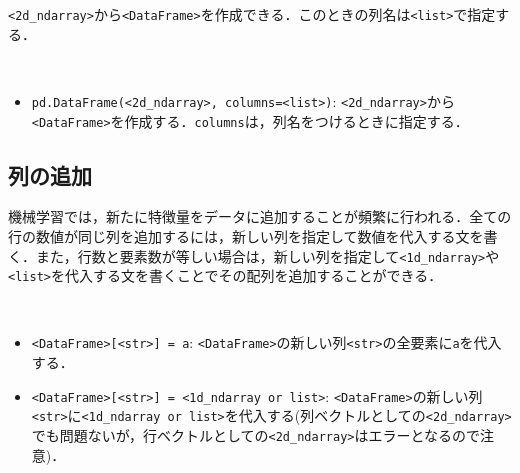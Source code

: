 \texttt{<2d\_ndarray>}から\texttt{<DataFrame>}を作成できる．このときの列名は\texttt{<list>}で指定する．

\begin{gram}　
\begin{itemize}
\item \texttt{pd.DataFrame(<2d\_ndarray>, columns=<list>)}: \texttt{<2d\_ndarray>}から\texttt{<DataFrame>}を作成する．\texttt{columns}は，列名をつけるときに指定する．
\end{itemize}
\end{gram}
\begin{cod}[\texttt{pd6.py}]　
}]{code/pd6.py}
\vspace{-10pt}
\begin{lstlisting}
df=
   col1  col2  col3
0     1     2     3
1     4     5     6
2     7     8     9
3    10    11    12
\end{lstlisting}
\end{cod}
\vspace{-10pt}

\subsection{列の追加}

機械学習では，新たに特徴量をデータに追加することが頻繁に行われる．全ての行の数値が同じ列を追加するには，新しい列を指定して数値を代入する文を書く．また，行数と要素数が等しい場合は，新しい列を指定して\texttt{<1d\_ndarray>}や\texttt{<list>}を代入する文を書くことでその配列を追加することができる．

\begin{gram}　
\begin{itemize}
\item \texttt{<DataFrame>[<str>] = a}: \texttt{<DataFrame>}の新しい列\texttt{<str>}の全要素に\texttt{a}を代入する．
\item \texttt{<DataFrame>[<str>] = <1d\_ndarray or list>}: \texttt{<DataFrame>}の新しい列\texttt{<str>}に\texttt{<1d\_ndarray or list>}を代入する(列ベクトルとしての\texttt{<2d\_ndarray>}でも問題ないが，行ベクトルとしての\texttt{<2d\_ndarray>}はエラーとなるので注意)．
\end{itemize}
\end{gram}
\begin{cod}[\texttt{pd3.py}]　
}]{code/pd3.py}
\vspace{-10pt}
\begin{lstlisting}
df=
   population   profit  all_1  ndarray  list
0      6.1101  17.5920      1        0     0
1      5.5277   9.1302      1        1     1
2      8.5186  13.6620      1        2     2
3      7.0032  11.8540      1        3     3
4      5.8598   6.8233      1        4     4
\end{lstlisting}
\end{cod}
\vspace{-10pt}

